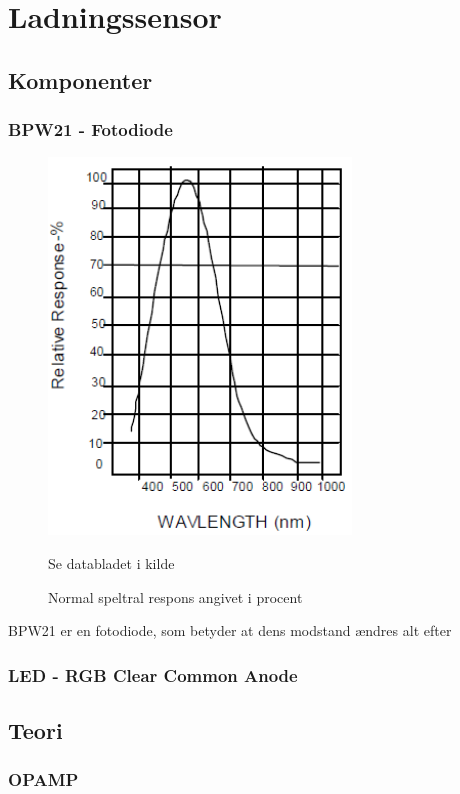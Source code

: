 \section{Ladningssensor}


\subsection{Komponenter}
\subsubsection{BPW21 - Fotodiode}
\begin{figure}[H]
	\centering
    \includegraphics[height=10cm]{figures/komponenter/photosensor}
	\caption{Normal speltral respons angivet i procent}
	Se databladet i kilde \cite{kompPhoto}
	\label{arduinoLCD}
\end{figure}
BPW21 er en fotodiode, som betyder at dens modstand ændres alt efter 

\subsubsection{LED - RGB Clear Common Anode}



\subsection{Teori}
\subsubsection{OPAMP}
